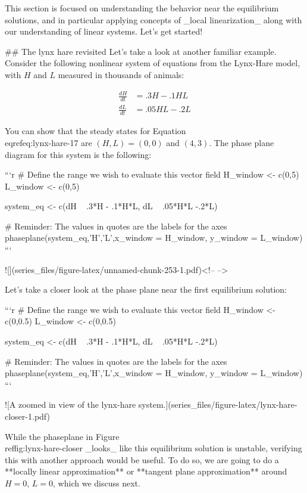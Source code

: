 \documentclass[
]{book}
\theoremstyle{definition}
\theoremstyle{definition}
\theoremstyle{definition}
\theoremstyle{remark}
\begin{document}
This section is focused on understanding the behavior near the equilibrium solutions, and in particular applying concepts of _local linearization_ along with our understanding of linear systems.  Let's get started!


## The lynx hare revisited
Let's take a look at another familiar example.  Consider the following nonlinear system of equations from the Lynx-Hare model, with $H$ and $L$ measured in thousands of animals:

\begin{equation}
\begin{split}
\frac{dH}{dt} &= .3 H - .1 HL \\  \label{eq:lynx-hare-17}
\frac{dL}{dt} &=.05HL -.2L
\end{split}
\end{equation}


You can show that the steady states for Equation \\eqref{eq:lynx-hare-17} are $(H,L)=(0,0)$ and $(4,3)$.  The phase plane diagram for this system is the following:


```r
# Define the range we wish to evaluate this vector field
H_window <- c(0,5)
L_window <- c(0,5)

system_eq <- c(dH ~ .3*H - .1*H*L,
               dL ~ .05*H*L -.2*L)

# Reminder: The values in quotes are the labels for the axes
phaseplane(system_eq,'H','L',x_window = H_window, y_window = L_window)  
```

![](series_files/figure-latex/unnamed-chunk-253-1.pdf)<!-- --> 

Let's take a closer look at the phase plane near the first equilibrium solution:


```r
# Define the range we wish to evaluate this vector field
H_window <- c(0,0.5)
L_window <- c(0,0.5)

system_eq <- c(dH ~ .3*H - .1*H*L,
               dL ~ .05*H*L -.2*L)

# Reminder: The values in quotes are the labels for the axes
phaseplane(system_eq,'H','L',x_window = H_window, y_window = L_window) 
```

![\label{fig:lynx-hare-closer}A zoomed in view of the lynx-hare system.](series_files/figure-latex/lynx-hare-closer-1.pdf) 

While the phaseplane in Figure \\ref{fig:lynx-hare-closer} _looks_ like this equilibrium solution is unstable, verifying this with another approach would be useful.  To do so, we are going to do a **locally linear approximation** or **tangent plane approximation** around $H=0$, $L=0$, which we discuss next.
\end{document}
